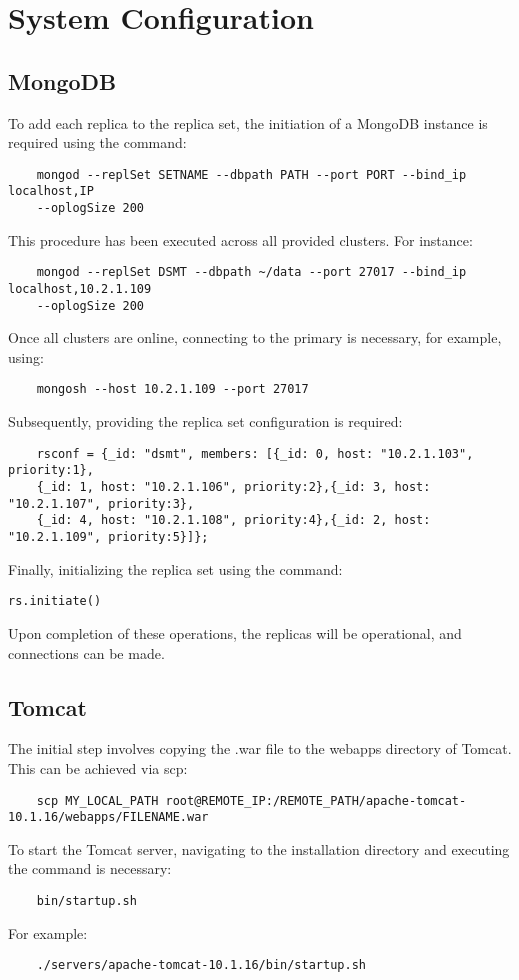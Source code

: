 \newpage
\section{System Configuration}
\subsection{MongoDB}
To add each replica to the replica set, the initiation of a MongoDB instance is required using the command:
\begin{verbatim}
    mongod --replSet SETNAME --dbpath PATH --port PORT --bind_ip localhost,IP 
    --oplogSize 200
\end{verbatim}
This procedure has been executed across all provided clusters. For instance:
\begin{verbatim}
    mongod --replSet DSMT --dbpath ~/data --port 27017 --bind_ip localhost,10.2.1.109 
    --oplogSize 200
\end{verbatim}
Once all clusters are online, connecting to the primary is necessary, for example, using:
\begin{verbatim}
    mongosh --host 10.2.1.109 --port 27017
\end{verbatim}
Subsequently, providing the replica set configuration is required:
\begin{verbatim}
    rsconf = {_id: "dsmt", members: [{_id: 0, host: "10.2.1.103", priority:1},
    {_id: 1, host: "10.2.1.106", priority:2},{_id: 3, host: "10.2.1.107", priority:3},
    {_id: 4, host: "10.2.1.108", priority:4},{_id: 2, host: "10.2.1.109", priority:5}]};
\end{verbatim}
Finally, initializing the replica set using the command:
\begin{verbatim}
rs.initiate()
\end{verbatim}
Upon completion of these operations, the replicas will be operational, and connections can be made.

\subsection{Tomcat}
The initial step involves copying the .war file to the webapps directory of Tomcat. This can be achieved via scp:
\begin{verbatim}
    scp MY_LOCAL_PATH root@REMOTE_IP:/REMOTE_PATH/apache-tomcat-10.1.16/webapps/FILENAME.war
\end{verbatim}
To start the Tomcat server, navigating to the installation directory and executing the command is necessary:
\begin{verbatim}
    bin/startup.sh
\end{verbatim}
For example:
\begin{verbatim}
    ./servers/apache-tomcat-10.1.16/bin/startup.sh
\end{verbatim}

